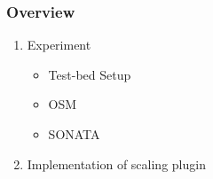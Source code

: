 \begin{frame}
\frametitle{Overview}
\begin{enumerate}
	
	\item Experiment
	\begin{itemize}
		\item Test-bed Setup
		\item OSM
		\item SONATA		
	\end{itemize}
	\item Implementation of scaling plugin

\end{enumerate}
\end{frame}
